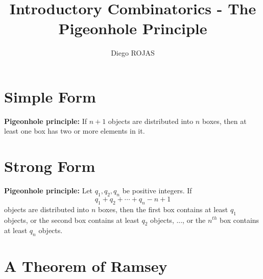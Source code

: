 \documentclass[12pt]{article}
\title{Introductory Combinatorics - The Pigeonhole Principle}
\author{Diego ROJAS}
\begin{document}
\maketitle
\tableofcontents

\section{Simple Form}

\textbf{Pigeonhole principle:} If $n+1$ objects are distributed into $n$ boxes, then at least one box has two or more elements in it.

\section{Strong Form}

\textbf{Pigeonhole principle:} Let $q_1, q_2, q_n$ be positive integers. If
%
\begin{equation}
	q_1 + q_2 + \cdots + q_n - n + 1
\end{equation}
%
objects are distributed into $n$ boxes, then the first box contains at least $q_1$ objects, or the second box contains at least $q_2$ objects, ..., or the $n^{th}$ box contains at least $q_n$ objects.

\section{A Theorem of Ramsey}
\end{document}
